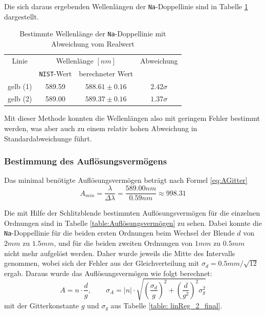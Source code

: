 \documentclass[a4paper, 11pt]{article}
\begin{document}
Die sich daraus ergebenden Wellenlängen der \texttt{Na}-Doppellinie sind in Tabelle \ref{table:NaWellenlängeErgebnisse} dargestellt.

\begin{table}[H]
	\large
	\centering
	\begin{tabular}{|c|c|c|c|}
		\hline
		Linie & \multicolumn{2}{|c|}{Wellenlänge $[nm]$} & Abweichung\\
		&	\texttt{NIST}-Wert & berechneter Wert & \\
		\hline
		gelb (1) & 589.59 & $588.61 \pm 0.16$ & $2.42\sigma$ \\
		\hline
		gelb (2) & 589.00 & $589.37 \pm 0.16$ & $1.37\sigma$ \\
		\hline
	\end{tabular}
	\caption{Bestimmte Wellenlänge der \texttt{Na}-Doppellinie mit Abweichung vom Realwert}
	\label{table:NaWellenlängeErgebnisse}
\end{table}

Mit dieser Methode konnten die Wellenlängen also mit geringem Fehler bestimmt werden, was aber auch zu einem relativ hohen Abweichung in Standardabweichunge führt.


\subsubsection{Bestimmung des Auflösungsvermögens}
Das minimal benötigte Auflösungsvermögen beträgt nach Formel \ref{eq:AGitter}
\begin{equation*}
A_{min} = \frac{\lambda}{\Delta \lambda} = \frac{589.00nm}{0.59nm} \approx 998.31
\end{equation*}

Die mit Hilfe der Schlitzblende bestimmten Auflösungsvermögen für die einzelnen Ordnungen sind in Tabelle \ref{table:Auflösungsvermögen} zu sehen. Dabei konnte die \texttt{Na}-Doppellinie für die beiden ersten Ordnungen beim Wechsel der Blende $d$ von $2mm$ zu $1.5mm$, und für die beiden zweiten Ordnungen von $1mm$ zu $0.5mm$ nicht mehr aufgelöst werden. Daher wurde jeweils die Mitte des Intervalls genommen, wobei sich der Fehler aus der Gleichverteilung mit $\sigma_d=0.5mm/\sqrt{12}$ ergab. Daraus wurde das Auflösungsvermögen wie folgt berechnet:
\begin{equation}
A = n \cdot \frac{d}{g}, \qquad \sigma_A = |n| \cdot \sqrt{\left(\frac{\sigma_d}{g}\right)^2 + \left(\frac{d}{g^2}\right)^2 \sigma_g^2}
\end{equation}
mit der Gitterkonstante $g$ und $\sigma_g$ aus Tabelle \ref{table: linReg_2_final}.
\end{document}

